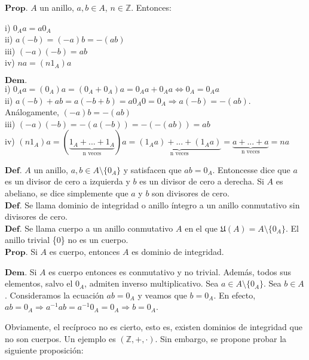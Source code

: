 \documentclass{article}
\begin{document}
$\textbf{Prop.}$ $A$ un anillo, $a,b \in A$, $n \in \mathbb{Z}$. Entonces:
\begin{adjustwidth}{0.5cm}{}
    i) $0_Aa = a0_A$\\
    ii) $a(-b) = (-a)b = - (ab)$\\
    iii) $(-a)(-b) = ab$\\
    iv) $na = (n1_A)a$
\end{adjustwidth}
\begin{adjustwidth}{1cm}{}
    $\textbf{Dem.}$ \\
    i) $0_Aa = (0_A)a = (0_A + 0_A)a = 0_Aa + 0_Aa \Longleftrightarrow 0_A = 0_Aa$\\
    ii) $a(-b) + ab = a(-b + b) = a0_A 0 = 0_A \Longrightarrow a(-b) = -(ab)$. Análogamente, $(-a)b = -(ab)$\\
    iii) $(-a)(-b) = -(a(-b)) = -(-(ab)) = ab$\\
    iv) $(n1_A)a = (\underbrace{1_A + ... + 1_A}_{\text{n veces}})a = \underbrace{(1_Aa) + ... + (1_Aa)}_{\text{n veces}} = \underbrace{a + ... + a}_{\text{n veces}} = na$\\
\end{adjustwidth}

$\textbf{Def.}$ $A$ un anillo, $a,b \in A\setminus \{0_A\}$ y satisfacen que $ab = 0_A$. Entoncesse dice que $a$ es un divisor de cero a izquierda y $b$ es un divisor de cero a derecha. Si $A$ es abeliano, se dice simplemente que $a$ y $b$ son divisores de cero.\\

$\textbf{Def.}$ Se llama dominio de integridad o anillo íntegro a un anillo conmutativo sin divisores de cero.\\

$\textbf{Def.}$ Se llama cuerpo a un anillo conmutativo $A$ en el que $\mathfrak{U}(A) = A\setminus \{0_A\}$. El anillo trivial \{0\} no es un cuerpo.\\

$\textbf{Prop.}$ Si $A$ es cuerpo, entonces $A$ es dominio de integridad.
\begin{adjustwidth}{1cm}{}
    $\textbf{Dem.}$ Si $A$ es cuerpo entonces es conmutativo y no trivial. Además, todos sus elementos, salvo el $0_A$, admiten inverso multiplicativo. Sea $a \in A \setminus \{0_A\}$. Sea $b\in A$. Consideramos la ecuación $ab = 0_A$ y veamos que $b = 0_A$. En efecto, $ab = 0_A \Longrightarrow a^{-1}ab = a^{-1}0_A = 0_A \Longrightarrow b = 0_A$.\\
\end{adjustwidth}
Obviamente, el recíproco no es cierto, esto es, existen dominios de integridad que no son cuerpos. Un ejemplo es $(\mathbb{Z}, +, \cdot)$. Sin embargo, se propone probar la siguiente proposición:\\
\end{document}
